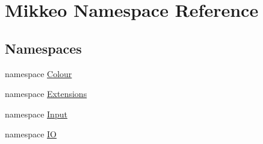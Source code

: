 \hypertarget{namespace_mikkeo}{}\section{Mikkeo Namespace Reference}
\label{namespace_mikkeo}
\subsection*{Namespaces}
\begin{DoxyCompactItemize}
\item 
namespace \hyperlink{namespace_mikkeo_1_1_colour}{Colour}
\item 
namespace \hyperlink{namespace_mikkeo_1_1_extensions}{Extensions}
\item 
namespace \hyperlink{namespace_mikkeo_1_1_input}{Input}
\item 
namespace \hyperlink{namespace_mikkeo_1_1_i_o}{IO}
\end{DoxyCompactItemize}
